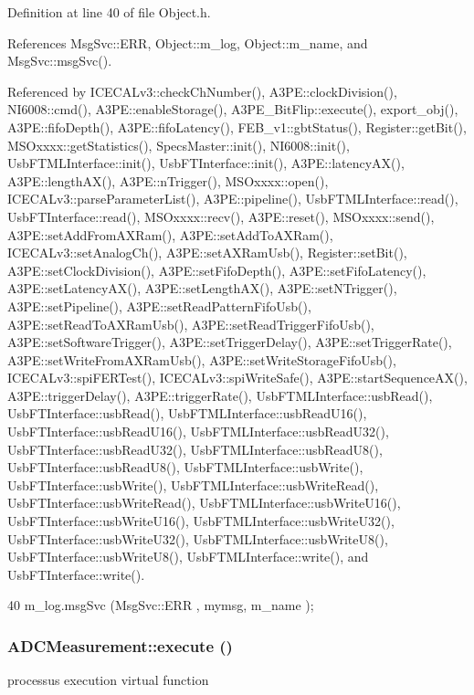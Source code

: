 Definition at line 40 of file Object.h.

References MsgSvc::ERR, Object::m\_\-log, Object::m\_\-name, and MsgSvc::msgSvc().

Referenced by ICECALv3::checkChNumber(), A3PE::clockDivision(), NI6008::cmd(), A3PE::enableStorage(), A3PE\_\-BitFlip::execute(), export\_\-obj(), A3PE::fifoDepth(), A3PE::fifoLatency(), FEB\_\-v1::gbtStatus(), Register::getBit(), MSOxxxx::getStatistics(), SpecsMaster::init(), NI6008::init(), UsbFTMLInterface::init(), UsbFTInterface::init(), A3PE::latencyAX(), A3PE::lengthAX(), A3PE::nTrigger(), MSOxxxx::open(), ICECALv3::parseParameterList(), A3PE::pipeline(), UsbFTMLInterface::read(), UsbFTInterface::read(), MSOxxxx::recv(), A3PE::reset(), MSOxxxx::send(), A3PE::setAddFromAXRam(), A3PE::setAddToAXRam(), ICECALv3::setAnalogCh(), A3PE::setAXRamUsb(), Register::setBit(), A3PE::setClockDivision(), A3PE::setFifoDepth(), A3PE::setFifoLatency(), A3PE::setLatencyAX(), A3PE::setLengthAX(), A3PE::setNTrigger(), A3PE::setPipeline(), A3PE::setReadPatternFifoUsb(), A3PE::setReadToAXRamUsb(), A3PE::setReadTriggerFifoUsb(), A3PE::setSoftwareTrigger(), A3PE::setTriggerDelay(), A3PE::setTriggerRate(), A3PE::setWriteFromAXRamUsb(), A3PE::setWriteStorageFifoUsb(), ICECALv3::spiFERTest(), ICECALv3::spiWriteSafe(), A3PE::startSequenceAX(), A3PE::triggerDelay(), A3PE::triggerRate(), UsbFTMLInterface::usbRead(), UsbFTInterface::usbRead(), UsbFTMLInterface::usbReadU16(), UsbFTInterface::usbReadU16(), UsbFTMLInterface::usbReadU32(), UsbFTInterface::usbReadU32(), UsbFTMLInterface::usbReadU8(), UsbFTInterface::usbReadU8(), UsbFTMLInterface::usbWrite(), UsbFTInterface::usbWrite(), UsbFTMLInterface::usbWriteRead(), UsbFTInterface::usbWriteRead(), UsbFTMLInterface::usbWriteU16(), UsbFTInterface::usbWriteU16(), UsbFTMLInterface::usbWriteU32(), UsbFTInterface::usbWriteU32(), UsbFTMLInterface::usbWriteU8(), UsbFTInterface::usbWriteU8(), UsbFTMLInterface::write(), and UsbFTInterface::write().


\begin{DoxyCode}
40 { m_log.msgSvc (MsgSvc::ERR     , mymsg, m_name ); }
\end{DoxyCode}
\hypertarget{classADCMeasurement_a82de69f0488646dfc50d28f611e2010d}{
\subsubsection[{execute}]{ ADCMeasurement::execute ()}}
\label{classADCMeasurement_a82de69f0488646dfc50d28f611e2010d}
processus execution virtual function 

